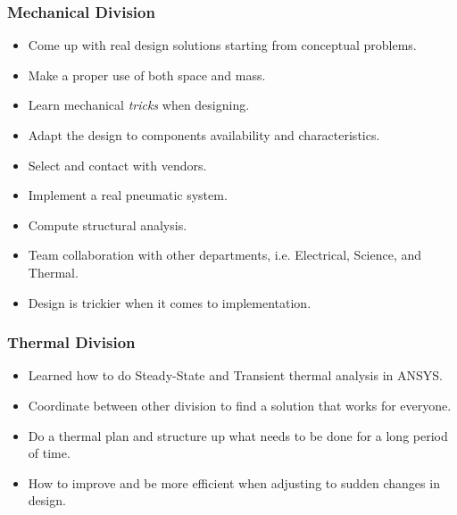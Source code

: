\subsubsection{Mechanical Division}

\begin{itemize}
    \item Come up with real design solutions starting from conceptual problems.
    \item Make a proper use of both space and mass.
    \item Learn mechanical \textit{tricks} when designing. 
    \item Adapt the design to components availability and characteristics.
    \item Select and contact with vendors.
    \item Implement a real pneumatic system. 
    \item Compute structural analysis. 
    \item Team collaboration with other departments, i.e. Electrical, Science, and Thermal.
    \item Design is trickier when it comes to implementation.
\end{itemize}

\subsubsection{Thermal Division}
\begin{itemize}
    \item Learned how to do Steady-State and Transient thermal analysis in ANSYS.
    \item Coordinate between other division to find a solution that works for everyone.
    \item Do a thermal plan and structure up what needs to be done for a long period of time.
    \item How to improve and be more efficient when adjusting to sudden changes in design.
\end{itemize}